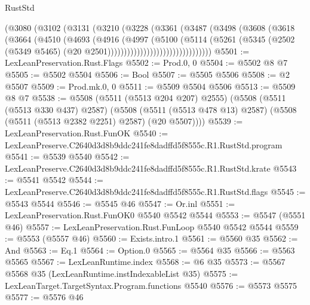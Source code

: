 \begin{lexlean}{RustStd}
\begin{coremodule}
                          (@3080
                            (@3102
                              (@3131
                                (@3210
                                  (@3228
                                    (@3361
                                      (@3487
                                        (@3498
                                          (@3608
                                            (@3618
                                              (@3664
                                                (@4510
                                                  (@4693
                                                    (@4916
                                                      (@4997
                                                        (@5100
                                                          (@5114
                                                            (@5261
                                                              (@5345
                                                                (@2502
                                                                  (@5349 @5465)
                                                                  (@20
                                                                    @2501))))))))))))))))))))))))))))))))
@5501 := LexLeanPreservation.Rust.Flags
@5502 := Prod.{0, 0}
@5504 := @5502 @8 @7
@5505 := @5502 @5504
@5506 := Bool
@5507 := @5505 @5506
@5508 := @2 @5507
@5509 := Prod.mk.{0, 0}
@5511 := @5509 @5504 @5506
@5513 := @5509 @8 @7
@5538 := @5508
    (@5511 (@5513 @204 @207) @2555)
    (@5508
      (@5511 (@5513 @330 @437) @2587)
      (@5508 (@5511 (@5513 @478 @13) @2587) (@5508 (@5511 (@5513 @2382 @2251) @2587) (@20 @5507))))
@5539 := LexLeanPreservation.Rust.FunOK
@5540 := LexLeanPreserve.C2640d3d8b9ddc241fe8dadffd5f8555c.R1.RustStd.program
@5541 := @5539 @5540
@5542 := LexLeanPreserve.C2640d3d8b9ddc241fe8dadffd5f8555c.R1.RustStd.krate
@5543 := @5541 @5542
@5544 := LexLeanPreserve.C2640d3d8b9ddc241fe8dadffd5f8555c.R1.RustStd.flags
@5545 := @5543 @5544
@5546 := @5545 @46
@5547 := Or.inl
@5551 := LexLeanPreservation.Rust.FunOK0 @5540 @5542 @5544
@5553 := @5547 (@5551 @46)
@5557 := LexLeanPreservation.Rust.FunLoop @5540 @5542 @5544
@5559 := @5553 (@5557 @46)
@5560 := Exists.intro.{1}
@5561 := @5560 @35
@5562 := And
@5563 := Eq.{1}
@5564 := Option.{0}
@5565 := @5564 @35
@5566 := @5563 @5565
@5567 := LexLeanRuntime.index
@5568 := @6 @35
@5573 := @5567 @5568 @35 (LexLeanRuntime.instIndexableList @35)
@5575 := LexLeanTarget.TargetSyntax.Program.functions @5540
@5576 := @5573 @5575
@5577 := @5576 @46

\end{coremodule}
\end{lexlean}
